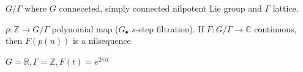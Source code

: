 \begin{definition}[Nilmanifold] $G/\Gamma$ where $G$ conneceted, simply connected nilpotent Lie group and $\Gamma$ lattice.
\end{definition}

\begin{definition}[Nilsequence] $p : \mathbb{Z} \to  G/\Gamma $ polynomial map ($G_\bullet$ $s$-step filtration). If $F : G/\Gamma \to \mathbb{C}$ continuous, then $F(p(n))$ is a nilsequence.
\end{definition}

\begin{example} $G = \mathbb{R}, \Gamma = \mathbb{Z}, F (t) =e^{2\pi it}$
\end{example}
